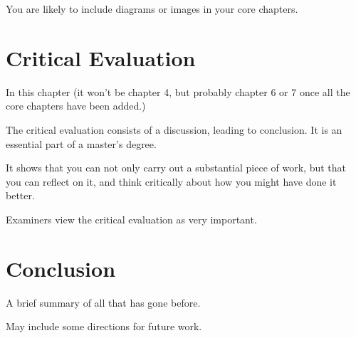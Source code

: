 \documentclass{main}
\begin{document}
You are likely to include diagrams or images in your core chapters.


\chapter{Critical Evaluation}

In this chapter (it won’t be chapter 4, but probably chapter 6 or 7 once all the core chapters have been added.)

The critical evaluation consists of a discussion, leading to conclusion.  It is an essential part of a master’s degree.

It shows that you can not only carry out a substantial piece of work, but that you can reflect on it, and think critically about how you might have done it better.

Examiners view the critical evaluation as very important.

\chapter{Conclusion}

A brief summary of all that has gone before.

May include some directions for future work.



\end{document}
